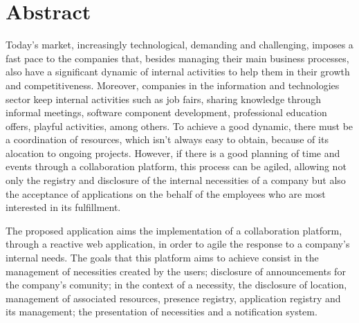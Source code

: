 \section{Abstract}\label{sec:abstract}
Today's market, increasingly technological, demanding and challenging, imposes a fast pace to the companies that, besides 
managing their main business processes, also have a significant dynamic of internal activities to help them in their growth 
and competitiveness. 
Moreover, companies in the information and technologies sector keep internal activities such as job fairs, sharing knowledge
through informal meetings, software component development, professional education offers, playful activities, among others.
To achieve a good dynamic, there must be a coordination of resources, which isn't always easy to obtain, because of its alocation to ongoing projects.
However, if there is a good planning of time and events through a collaboration platform, this process can be agiled, allowing 
not only the registry and disclosure of the internal necessities of a company but also the acceptance of applications on the behalf of the employees who are 
most interested in its fulfillment. 

\par

The proposed application aims the implementation of a collaboration platform, through a reactive web application, in order to agile the response to a company's internal needs.
The goals that this platform aims to achieve consist in the management of necessities created by the users;
disclosure of announcements for the company's comunity;
in the context of a necessity, the disclosure of location, 
management of associated resources, presence registry, application registry and its management;
the presentation of necessities and a notification system.